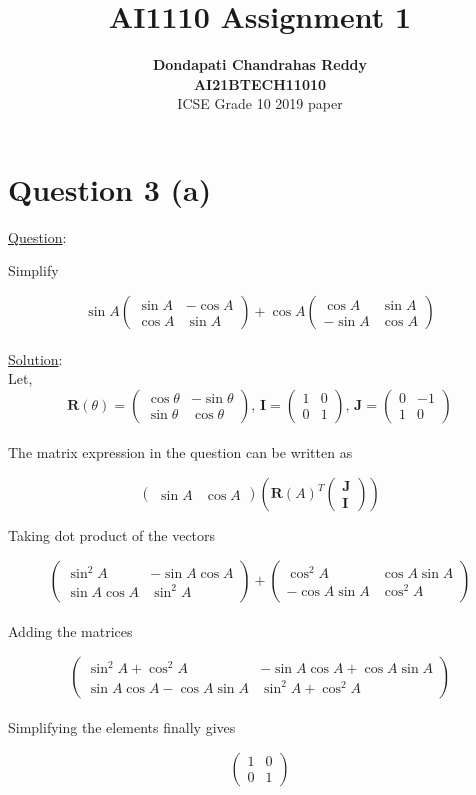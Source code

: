 \documentclass[journal,12pt,twocolumn]{IEEEtran}
\newcommand{\myvec}[1]{\ensuremath{\begin{pmatrix}#1\end{pmatrix}}}
\let\vec\mathbf
\begin{document}
\title{\textbf{AI1110 Assignment 1} }
\author{\textbf{Dondapati Chandrahas Reddy}\\ \textbf{AI21BTECH11010}\\ ICSE Grade 10 2019 paper}

\maketitle

{\section {Question 3 (a) \newline}}

{\large \underline{Question}:\newline}

Simplify

\begin{equation*}
	\sin A\myvec{\sin A &  -\cos A \\ \cos A & \sin A} + \cos A \myvec{\cos A &  \sin A \\ -\sin A & \cos A}
\end{equation*}\\

{\large \underline{Solution}:}\\

Let,
\begin{equation*}
	\vec{R}(\theta) = \myvec{\cos \theta &  -\sin \theta \\ \sin \theta & \cos \theta} ,\, \vec{I} = \myvec{1 & 0 \\ 0 & 1} ,\, \vec{J} = \myvec{0 & -1 \\ 1 & 0}
\end{equation*}\\

The matrix expression in the question can be written as

\begin{equation*}
	\myvec{\sin A & \cos A} \left( \vec{R}(A)^T \myvec{\vec{J} \\ \vec{I}} \right)
\end{equation*}

Taking dot product of the vectors

\begin{equation*}
	\myvec{\sin^2 A &  -\sin A\cos A \\ \sin A\cos A & \sin^2 A} +\myvec{\cos^2 A & \cos A\sin A \\ -\cos A\sin A & \cos^2 A}
\end{equation*}\\

Adding the matrices

\begin{equation*}
	\myvec{\sin^2 A + \cos^2 A &  -\sin A \cos A +\cos A \sin A \\ \sin A \cos A -\cos A \sin A & \sin^2 A + \cos^2 A}
\end{equation*}\\

Simplifying the elements finally gives

\begin{equation*}
	\myvec{1 & 0 \\ 0 & 1}
\end{equation*}\\
\end{document}
